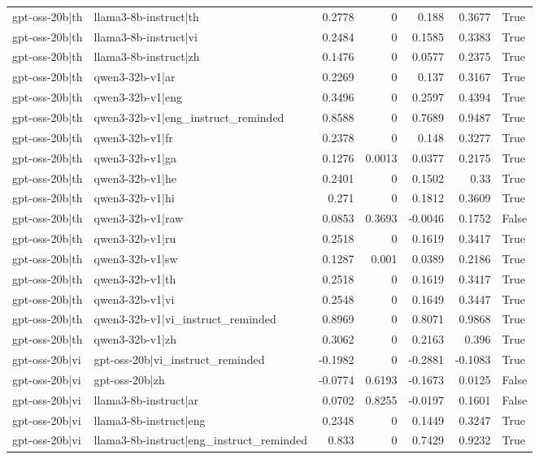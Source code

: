 \begin{table}
\begin{tabular}{l l r r r r l}
gpt-oss-20b|th & llama3-8b-instruct|th & 0.2778 & 0 & 0.188 & 0.3677 & True \\
gpt-oss-20b|th & llama3-8b-instruct|vi & 0.2484 & 0 & 0.1585 & 0.3383 & True \\
gpt-oss-20b|th & llama3-8b-instruct|zh & 0.1476 & 0 & 0.0577 & 0.2375 & True \\
gpt-oss-20b|th & qwen3-32b-v1|ar & 0.2269 & 0 & 0.137 & 0.3167 & True \\
gpt-oss-20b|th & qwen3-32b-v1|eng & 0.3496 & 0 & 0.2597 & 0.4394 & True \\
gpt-oss-20b|th & qwen3-32b-v1|eng_instruct_reminded & 0.8588 & 0 & 0.7689 & 0.9487 & True \\
gpt-oss-20b|th & qwen3-32b-v1|fr & 0.2378 & 0 & 0.148 & 0.3277 & True \\
gpt-oss-20b|th & qwen3-32b-v1|ga & 0.1276 & 0.0013 & 0.0377 & 0.2175 & True \\
gpt-oss-20b|th & qwen3-32b-v1|he & 0.2401 & 0 & 0.1502 & 0.33 & True \\
gpt-oss-20b|th & qwen3-32b-v1|hi & 0.271 & 0 & 0.1812 & 0.3609 & True \\
gpt-oss-20b|th & qwen3-32b-v1|raw & 0.0853 & 0.3693 & -0.0046 & 0.1752 & False \\
gpt-oss-20b|th & qwen3-32b-v1|ru & 0.2518 & 0 & 0.1619 & 0.3417 & True \\
gpt-oss-20b|th & qwen3-32b-v1|sw & 0.1287 & 0.001 & 0.0389 & 0.2186 & True \\
gpt-oss-20b|th & qwen3-32b-v1|th & 0.2518 & 0 & 0.1619 & 0.3417 & True \\
gpt-oss-20b|th & qwen3-32b-v1|vi & 0.2548 & 0 & 0.1649 & 0.3447 & True \\
gpt-oss-20b|th & qwen3-32b-v1|vi_instruct_reminded & 0.8969 & 0 & 0.8071 & 0.9868 & True \\
gpt-oss-20b|th & qwen3-32b-v1|zh & 0.3062 & 0 & 0.2163 & 0.396 & True \\
gpt-oss-20b|vi & gpt-oss-20b|vi_instruct_reminded & -0.1982 & 0 & -0.2881 & -0.1083 & True \\
gpt-oss-20b|vi & gpt-oss-20b|zh & -0.0774 & 0.6193 & -0.1673 & 0.0125 & False \\
gpt-oss-20b|vi & llama3-8b-instruct|ar & 0.0702 & 0.8255 & -0.0197 & 0.1601 & False \\
gpt-oss-20b|vi & llama3-8b-instruct|eng & 0.2348 & 0 & 0.1449 & 0.3247 & True \\
gpt-oss-20b|vi & llama3-8b-instruct|eng_instruct_reminded & 0.833 & 0 & 0.7429 & 0.9232 & True \\

\end{tabular}
\end{table}
